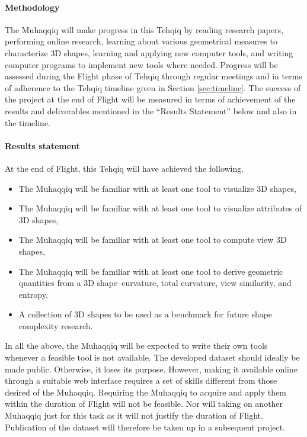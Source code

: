 \documentclass{article}
\begin{document}
\paragraph{Methodology} The Muhaqqiq will make progress in this Tehqiq by reading research papers, performing online research, learning about various geometrical measures to characterize 3D shapes, learning and applying new computer tools, and writing computer programs to implement new tools where needed. Progress will be assessed during the Flight phase of Tehqiq through regular meetings and in terms of adherence to the Tehqiq timeline given in Section \ref{sec:timeline}. The success of the project at the end of Flight will be measured in terms of achievement of the results and deliverables mentioned in the ``Results Statement'' below and also in the timeline.
\paragraph{Results statement} At the end of Flight, this Tehqiq will have achieved the following.
\begin{itemize}
  \item The Muhaqqiq will be familiar with at least one tool to visualize 3D shapes,
  \item The Muhaqqiq will be familiar with at least one tool to visualize attributes of 3D shapes,
  \item The Muhaqqiq will be familiar with at least one tool to compute view 3D shapes,
  \item The Muhaqqiq will be familiar with at least one tool to derive geometric quantities from a 3D shape--curvature, total curvature, view similarity, and entropy.
  \item A collection of 3D shapes to be used as a benchmark for future shape complexity research.
\end{itemize}
In all the above, the Muhaqqiq will be expected to write their own tools whenever a feasible tool is not available. The developed dataset should ideally be made public. Otherwise, it loses its purpose. However, making it available online through a suitable web interface requires a set of skills different from those desired of the Muhaqqiq. Requiring the Muhaqqiq to acquire and apply them within the duration of Flight will not be feasible. Nor will taking on another Muhaqqiq just for this task as it will not justify the duration of Flight. Publication of the dataset will therefore be taken up in a subsequent project.
\end{document}
